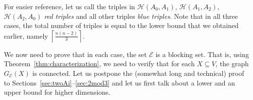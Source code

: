 \documentclass[11pt,a4paper]{article}
\begin{document}




For easier reference, let us call the triples in $\mathcal{H}(A_0,A_1)$, $\mathcal{H}(A_1,A_2)$, $\mathcal{H}(A_2,A_0)$ {\em red triples} and all other triples {\em blue triples}. Note that in all three cases, the total number of triples is equal to the lower bound that we obtained earlier, namely $\left\lceil \frac{n(n-2)}{3} \right\rceil$.

We now need to prove that in each case, the set $\mathcal{E}$ is a blocking set. That is, using Theorem~\ref{thm:characterization}, we need to verify that for each $X\subseteq V$, the graph $G_{\mathcal{E}}(X)$ is connected. Let us postpone the (somewhat long and technical) proof to Sections~\ref{sec:twoAi}--\ref{sec:2mod3} and let us first talk about a lower and an upper bound for higher dimensions.
\end{document}

